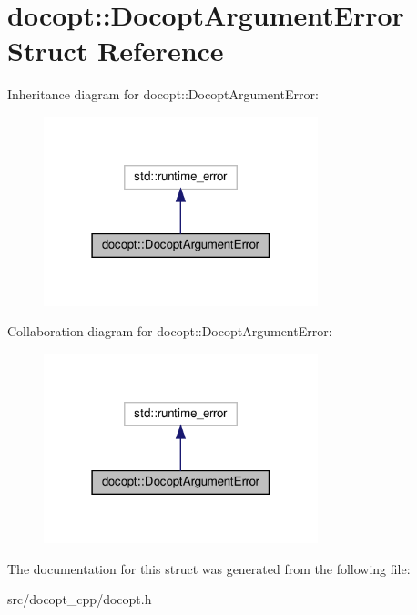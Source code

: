 \hypertarget{structdocopt_1_1DocoptArgumentError}{}\section{docopt\+:\+:Docopt\+Argument\+Error Struct Reference}
\label{structdocopt_1_1DocoptArgumentError}


Inheritance diagram for docopt\+:\+:Docopt\+Argument\+Error\+:
\nopagebreak
\begin{figure}[H]
\begin{center}
\leavevmode
\includegraphics[width=226pt]{structdocopt_1_1DocoptArgumentError__inherit__graph}
\end{center}
\end{figure}


Collaboration diagram for docopt\+:\+:Docopt\+Argument\+Error\+:
\nopagebreak
\begin{figure}[H]
\begin{center}
\leavevmode
\includegraphics[width=226pt]{structdocopt_1_1DocoptArgumentError__coll__graph}
\end{center}
\end{figure}


The documentation for this struct was generated from the following file\+:\begin{DoxyCompactItemize}
\item 
src/docopt\+\_\+cpp/docopt.\+h\end{DoxyCompactItemize}
